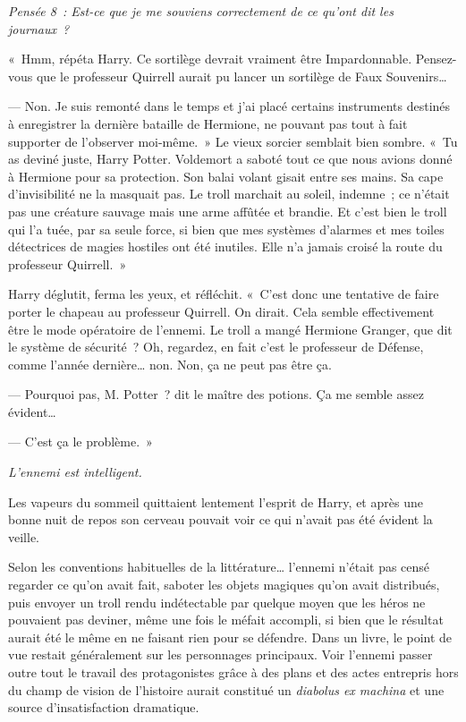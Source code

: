 \emph{Pensée 8~: Est-ce que je me souviens correctement de ce qu'ont dit les journaux~?}

«~Hmm, répéta Harry.
Ce sortilège devrait vraiment être Impardonnable.
Pensez-vous que le professeur Quirrell aurait pu lancer un sortilège de Faux Souvenirs…

--- Non.
Je suis remonté dans le temps et j'ai placé certains instruments destinés à enregistrer la dernière bataille de Hermione, ne pouvant pas tout à fait supporter de l'observer moi-même.~»
Le vieux sorcier semblait bien sombre.
«~Tu as deviné juste, Harry Potter.
Voldemort a saboté tout ce que nous avions donné à Hermione pour sa protection.
Son balai volant gisait entre ses mains.
Sa cape d'invisibilité ne la masquait pas.
Le troll marchait au soleil, indemne~; ce n'était pas une créature sauvage mais une arme affûtée et brandie.
Et c'est bien le troll qui l'a tuée, par sa seule force, si bien que mes systèmes d'alarmes et mes toiles détectrices de magies hostiles ont été inutiles.
Elle n'a jamais croisé la route du professeur Quirrell.~»

Harry déglutit, ferma les yeux, et réfléchit.
«~C'est donc une tentative de faire porter le chapeau au professeur Quirrell.
On dirait.
Cela semble effectivement être le mode opératoire de l'ennemi.
Le troll a mangé Hermione Granger, que dit le système de sécurité~?
Oh, regardez, en fait c'est le professeur de Défense, comme l'année dernière… non.
Non, ça ne peut pas être ça.

--- Pourquoi pas, M. Potter~? dit le maître des potions.
Ça me semble assez évident…

--- C'est ça le problème.~»

\emph{L'ennemi est intelligent.}

Les vapeurs du sommeil quittaient lentement l'esprit de Harry, et après une bonne nuit de repos son cerveau pouvait voir ce qui n'avait pas été évident la veille.

Selon les conventions habituelles de la littérature… l'ennemi n'était pas censé regarder ce qu'on avait fait, saboter les objets magiques qu'on avait distribués, puis envoyer un troll rendu indétectable par quelque moyen que les héros ne pouvaient pas deviner, même une fois le méfait accompli, si bien que le résultat aurait été le même en ne faisant rien pour se défendre.
Dans un livre, le point de vue restait généralement sur les personnages principaux.
Voir l'ennemi passer outre tout le travail des protagonistes grâce à des plans et des actes entrepris hors du champ de vision de l'histoire aurait constitué un \emph{diabolus ex machina} et une source d'insatisfaction dramatique.

